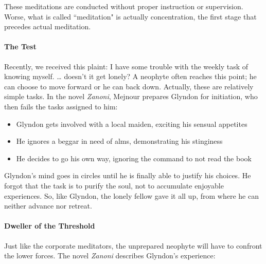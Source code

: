 These meditations are conducted without proper instruction or supervision. Worse, what is called ``meditation" is
actually concentration, the first stage that precedes actual meditation.

\paragraph{The Test}
Recently, we received this plaint: I have some trouble with the weekly task of knowing myself. …
doesn't it get lonely? A neophyte often reaches this point; he can choose to move forward or he
can back down. Actually, these are relatively simple tasks. In the novel \emph{Zanoni}, Mejnour prepares Glyndon for
initiation, who then fails the tasks assigned to him:

\begin{itemize}
\item Glyndon gets involved with a local maiden, exciting his sensual appetites 
\item He ignores a beggar in need of alms, demonstrating his stinginess 
\item He decides to go his own way, ignoring the command to not read the book 
\end{itemize}
Glyndon's mind goes in circles until he is finally able to justify his choices. He forgot that the
task is to purify the soul, not to accumulate enjoyable experiences. So, like Glyndon, the lonely fellow gave it all
up, from where he can neither advance nor retreat.

\paragraph{Dweller of the Threshold}
Just like the corporate meditators, the unprepared neophyte will have to confront the lower forces. The novel
\emph{Zanoni} describes Glyndon's experience:

